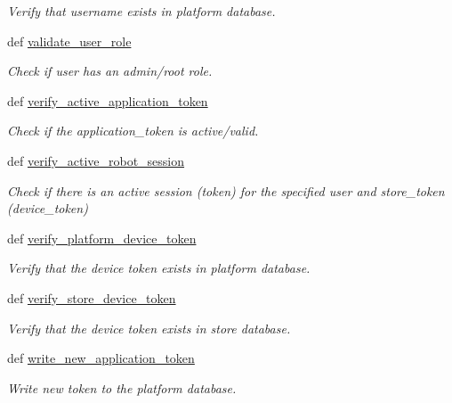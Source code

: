 \begin{DoxyCompactItemize}
\begin{DoxyCompactList}\small\item\em Verify that username exists in platform database. \end{DoxyCompactList}\item 
def \hyperlink{classrapp__application__authentication__manager_1_1database__handler_1_1DatabaseHandler_aee102581c03f4b70bce6ad761de4eab4}{validate\-\_\-user\-\_\-role}
\begin{DoxyCompactList}\small\item\em Check if user has an admin/root role. \end{DoxyCompactList}\item 
def \hyperlink{classrapp__application__authentication__manager_1_1database__handler_1_1DatabaseHandler_a14b72d315837bfd8d913c2f0d23cbba9}{verify\-\_\-active\-\_\-application\-\_\-token}
\begin{DoxyCompactList}\small\item\em Check if the application\-\_\-token is active/valid. \end{DoxyCompactList}\item 
def \hyperlink{classrapp__application__authentication__manager_1_1database__handler_1_1DatabaseHandler_a813e2701ff2670ceb49e647c46cf8b54}{verify\-\_\-active\-\_\-robot\-\_\-session}
\begin{DoxyCompactList}\small\item\em Check if there is an active session (token) for the specified user and store\-\_\-token (device\-\_\-token) \end{DoxyCompactList}\item 
def \hyperlink{classrapp__application__authentication__manager_1_1database__handler_1_1DatabaseHandler_a01bbfd0ed934a2987d3f6db6008b9e01}{verify\-\_\-platform\-\_\-device\-\_\-token}
\begin{DoxyCompactList}\small\item\em Verify that the device token exists in platform database. \end{DoxyCompactList}\item 
def \hyperlink{classrapp__application__authentication__manager_1_1database__handler_1_1DatabaseHandler_af8d8ee721f892fdce17ab67d8217cfea}{verify\-\_\-store\-\_\-device\-\_\-token}
\begin{DoxyCompactList}\small\item\em Verify that the device token exists in store database. \end{DoxyCompactList}\item 
def \hyperlink{classrapp__application__authentication__manager_1_1database__handler_1_1DatabaseHandler_ac508819d954ef10696106e9875d8bdb3}{write\-\_\-new\-\_\-application\-\_\-token}
\begin{DoxyCompactList}\small\item\em Write new token to the platform database. \end{DoxyCompactList}\end{DoxyCompactItemize}
